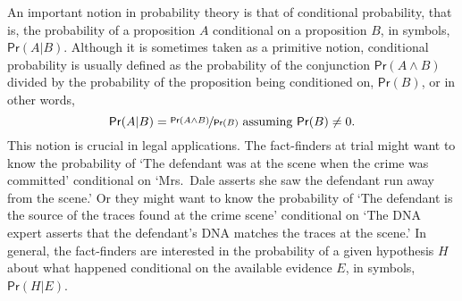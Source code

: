 \documentclass{article}
\newcommand{\pr}{\mathsf{Pr}}
\begin{document}

 An important notion in probability theory is that of conditional probability, that is, the probability of a proposition $A$ conditional on a proposition $B$, in symbols, $\pr( A\vert B)$. Although it is sometimes taken as a primitive notion, conditional probability is usually defined as the probability of the conjunction
 $\pr(A \wedge B)$ divided by the probability of the proposition being conditioned on, $\pr(B)$, or in other words,
 \[\pr(A \vert B)= \nicefrac{\pr(A \wedge B)}{\pr(B)} \text{ assuming $\pr(B)\neq 0$.} \]
 This notion is crucial in legal applications. 
The fact-finders at trial might want to know the probability of `The defendant was at the scene when the crime was committed' conditional on 
`Mrs.\ Dale asserts she saw the defendant run away from 
the scene.' Or they might want to know the probability of `The defendant is the source of the  traces found at the crime scene' conditional on `The DNA expert asserts that the defendant's DNA matches the traces at the scene.'  In general, the fact-finders are interested in the probability of a given hypothesis $H$ about what happened conditional on the available evidence $E$, in symbols, $\pr(H \vert E)$.






%

\end{document}
